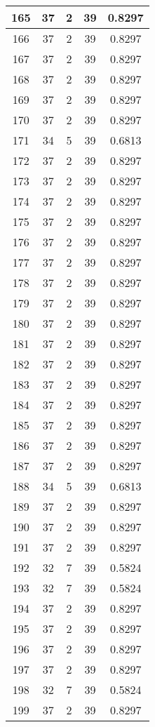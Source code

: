 \documentclass[letterpaper, 12pt]{article}
\begin{document}
\begin{longtable}{|c|c|c|c|c|}
165 & 37 & 2 & 39 & 0.8297 \\
\hline
166 & 37 & 2 & 39 & 0.8297 \\
\hline
167 & 37 & 2 & 39 & 0.8297 \\
\hline
168 & 37 & 2 & 39 & 0.8297 \\
\hline
169 & 37 & 2 & 39 & 0.8297 \\
\hline
170 & 37 & 2 & 39 & 0.8297 \\
\hline
171 & 34 & 5 & 39 & 0.6813 \\
\hline
172 & 37 & 2 & 39 & 0.8297 \\
\hline
173 & 37 & 2 & 39 & 0.8297 \\
\hline
174 & 37 & 2 & 39 & 0.8297 \\
\hline
175 & 37 & 2 & 39 & 0.8297 \\
\hline
176 & 37 & 2 & 39 & 0.8297 \\
\hline
177 & 37 & 2 & 39 & 0.8297 \\
\hline
178 & 37 & 2 & 39 & 0.8297 \\
\hline
179 & 37 & 2 & 39 & 0.8297 \\
\hline
180 & 37 & 2 & 39 & 0.8297 \\
\hline
181 & 37 & 2 & 39 & 0.8297 \\
\hline
182 & 37 & 2 & 39 & 0.8297 \\
\hline
183 & 37 & 2 & 39 & 0.8297 \\
\hline
184 & 37 & 2 & 39 & 0.8297 \\
\hline
185 & 37 & 2 & 39 & 0.8297 \\
\hline
186 & 37 & 2 & 39 & 0.8297 \\
\hline
187 & 37 & 2 & 39 & 0.8297 \\
\hline
188 & 34 & 5 & 39 & 0.6813 \\
\hline
189 & 37 & 2 & 39 & 0.8297 \\
\hline
190 & 37 & 2 & 39 & 0.8297 \\
\hline
191 & 37 & 2 & 39 & 0.8297 \\
\hline
192 & 32 & 7 & 39 & 0.5824 \\
\hline
193 & 32 & 7 & 39 & 0.5824 \\
\hline
194 & 37 & 2 & 39 & 0.8297 \\
\hline
195 & 37 & 2 & 39 & 0.8297 \\
\hline
196 & 37 & 2 & 39 & 0.8297 \\
\hline
197 & 37 & 2 & 39 & 0.8297 \\
\hline
198 & 32 & 7 & 39 & 0.5824 \\
\hline
199 & 37 & 2 & 39 & 0.8297 \\
\hline
\end{longtable}
\end{document}
